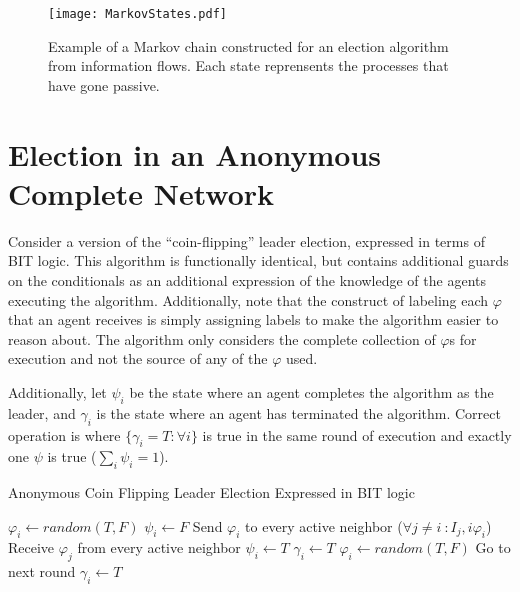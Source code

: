 \begin{figure}
\begin{centering}
\texttt{[image: MarkovStates.pdf]}
\caption{Example of a Markov chain constructed for an election algorithm from information flows. Each state reprensents the processes that have gone passive.}
\label{fig:markovstates}
\end{centering}
\end{figure}

\section{Election in an Anonymous Complete Network}

Consider a version of the ``coin-flipping'' leader election, expressed in terms of BIT logic.
This algorithm is functionally identical, but contains additional guards on the conditionals as an additional expression of the knowledge of the agents executing the algorithm.
Additionally, note that the construct of labeling each $\varphi$ that an agent receives is simply assigning labels to make the algorithm easier to reason about.
The algorithm only considers the complete collection of $\varphi$s for execution and not the source of any of the $\varphi$ used.

Additionally, let $\psi_i$ be the state where an agent completes the algorithm as the leader, and $\gamma_i$ is the state where an agent has terminated the algorithm.
Correct operation is where $\{\gamma_i = T : \forall i \}$ is true in the same round of execution and exactly one $\psi$ is true ($\sum_i \psi_i = 1$).

\begin{algorithm}
\caption{Anonymous Coin Flipping Leader Election Expressed in BIT logic}
\label{alg:coinflip}
\begin{algorithmic}[1]
\small
\State $\varphi_i \gets random(T,F)$
\State $\psi_i \gets F$
\State Send $\varphi_i$ to every active neighbor ($\forall j \neq i\ : I_j,i \varphi_i$)
\State Receive $\varphi_j$ from every active neighbor 
	\State $\psi_i \gets T$
	\State $\gamma_i \gets T$
	\State $\varphi_i \gets random(T,F)$
	\State Go to next round
	\State $\gamma_i \gets T$
\EndIf
\end{algorithmic}
\end{algorithm}

